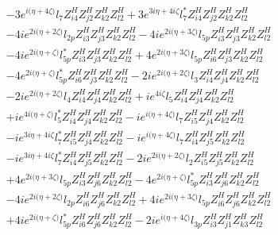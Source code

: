 \begin{align}
 &-3 e^{i \Big(\eta +4 \zeta \Big)} l_7 Z_{{i 4}}^{H} Z_{{j 2}}^{H} Z_{{k 2}}^{H} Z_{{l 2}}^{H} +3 e^{3 i \eta +4 i \zeta } l_7^* Z_{{i 4}}^{H} Z_{{j 2}}^{H} Z_{{k 2}}^{H} Z_{{l 2}}^{H} \nonumber \\ 
 &-4 i e^{2 i \Big(\eta +2 \zeta \Big)} l_{2p} Z_{{i 3}}^{H} Z_{{j 3}}^{H} Z_{{k 2}}^{H} Z_{{l 2}}^{H} -4 i e^{2 i \Big(\eta +3 \zeta \Big)} l_{5p} Z_{{i 3}}^{H} Z_{{j 3}}^{H} Z_{{k 2}}^{H} Z_{{l 2}}^{H} \nonumber \\ 
 &-4 i e^{2 i \Big(\eta +\zeta \Big)} l_{5p}^* Z_{{i 3}}^{H} Z_{{j 3}}^{H} Z_{{k 2}}^{H} Z_{{l 2}}^{H} +4 e^{2 i \Big(\eta +3 \zeta \Big)} l_{5p} Z_{{i 6}}^{H} Z_{{j 3}}^{H} Z_{{k 2}}^{H} Z_{{l 2}}^{H} \nonumber \\ 
 &-4 e^{2 i \Big(\eta +\zeta \Big)} l_{5p}^* Z_{{i 6}}^{H} Z_{{j 3}}^{H} Z_{{k 2}}^{H} Z_{{l 2}}^{H} -2 i e^{2 i \Big(\eta +2 \zeta \Big)} l_3 Z_{{i 4}}^{H} Z_{{j 4}}^{H} Z_{{k 2}}^{H} Z_{{l 2}}^{H} \nonumber \\ 
 &-2 i e^{2 i \Big(\eta +2 \zeta \Big)} l_4 Z_{{i 4}}^{H} Z_{{j 4}}^{H} Z_{{k 2}}^{H} Z_{{l 2}}^{H} +i e^{4 i \zeta } l_5 Z_{{i 4}}^{H} Z_{{j 4}}^{H} Z_{{k 2}}^{H} Z_{{l 2}}^{H} \nonumber \\ 
 &+i e^{4 i \Big(\eta +\zeta \Big)} l_5^* Z_{{i 4}}^{H} Z_{{j 4}}^{H} Z_{{k 2}}^{H} Z_{{l 2}}^{H} -i e^{i \Big(\eta +4 \zeta \Big)} l_7 Z_{{i 5}}^{H} Z_{{j 4}}^{H} Z_{{k 2}}^{H} Z_{{l 2}}^{H} \nonumber \\ 
 &-i e^{3 i \eta +4 i \zeta } l_7^* Z_{{i 5}}^{H} Z_{{j 4}}^{H} Z_{{k 2}}^{H} Z_{{l 2}}^{H} -i e^{i \Big(\eta +4 \zeta \Big)} l_7 Z_{{i 4}}^{H} Z_{{j 5}}^{H} Z_{{k 2}}^{H} Z_{{l 2}}^{H} \nonumber \\ 
 &-i e^{3 i \eta +4 i \zeta } l_7^* Z_{{i 4}}^{H} Z_{{j 5}}^{H} Z_{{k 2}}^{H} Z_{{l 2}}^{H} -2 i e^{2 i \Big(\eta +2 \zeta \Big)} l_2 Z_{{i 5}}^{H} Z_{{j 5}}^{H} Z_{{k 2}}^{H} Z_{{l 2}}^{H} \nonumber \\ 
 &+4 e^{2 i \Big(\eta +3 \zeta \Big)} l_{5p} Z_{{i 3}}^{H} Z_{{j 6}}^{H} Z_{{k 2}}^{H} Z_{{l 2}}^{H} -4 e^{2 i \Big(\eta +\zeta \Big)} l_{5p}^* Z_{{i 3}}^{H} Z_{{j 6}}^{H} Z_{{k 2}}^{H} Z_{{l 2}}^{H} \nonumber \\ 
 &-4 i e^{2 i \Big(\eta +2 \zeta \Big)} l_{2p} Z_{{i 6}}^{H} Z_{{j 6}}^{H} Z_{{k 2}}^{H} Z_{{l 2}}^{H} +4 i e^{2 i \Big(\eta +3 \zeta \Big)} l_{5p} Z_{{i 6}}^{H} Z_{{j 6}}^{H} Z_{{k 2}}^{H} Z_{{l 2}}^{H} \nonumber \\ 
 &+4 i e^{2 i \Big(\eta +\zeta \Big)} l_{5p}^* Z_{{i 6}}^{H} Z_{{j 6}}^{H} Z_{{k 2}}^{H} Z_{{l 2}}^{H} -2 i e^{i \Big(\eta +4 \zeta \Big)} l_{3p} Z_{{i 3}}^{H} Z_{{j 1}}^{H} Z_{{k 3}}^{H} Z_{{l 2}}^{H} \nonumber \\ 

\end{align}
